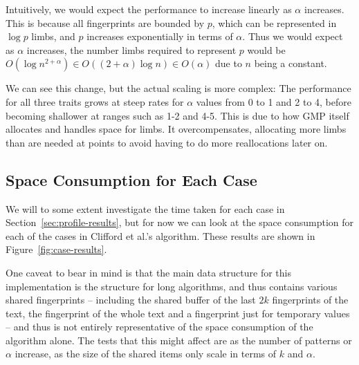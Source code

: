 \documentclass[ %
                    author={Dominic Joseph Moylett},
                    degree={MEng},
                     title={Dictionary Matching with Fingerprints},
                  subtitle={An Empirical Analysis},
                      type={research},
                      year={2015} ]{dissertation}
\begin{document}
Intuitively, we would expect the performance to increase linearly as $\alpha$ increases. This is because all fingerprints are bounded by $p$, which can be represented in $\log p$ limbs, and $p$ increases exponentially in terms of $\alpha$. Thus we would expect as $\alpha$ increases, the number limbs required to represent $p$ would be $O(\log n^{2 + \alpha}) \in O((2 + \alpha)\log n) \in O(\alpha)$ due to $n$ being a constant.

We can see this change, but the actual scaling is more complex: The performance for all three traits grows at steep rates for $\alpha$ values from 0 to 1 and 2 to 4, before becoming shallower at ranges such as 1-2 and 4-5. This is due to how GMP itself allocates and handles space for limbs. It overcompensates, allocating more limbs than are needed at points to avoid having to do more reallocations later on.

\subsection{Space Consumption for Each Case}

We will to some extent investigate the time taken for each case in Section~\ref{sec:profile-results}, but for now we can look at the space consumption for each of the cases in Clifford et al.'s algorithm. These results are shown in Figure~\ref{fig:case-results}.

One caveat to bear in mind is that the main data structure for this implementation is the structure for long algorithms, and thus contains various shared fingerprints -- including the shared buffer of the last $2k$ fingerprints of the text, the fingerprint of the whole text and a fingerprint just for temporary values -- and thus is not entirely representative of the space consumption of the algorithm alone. The tests that this might affect are as the number of patterns or $\alpha$ increase, as the size of the shared items only scale in terms of $k$ and $\alpha$.
\end{document}

